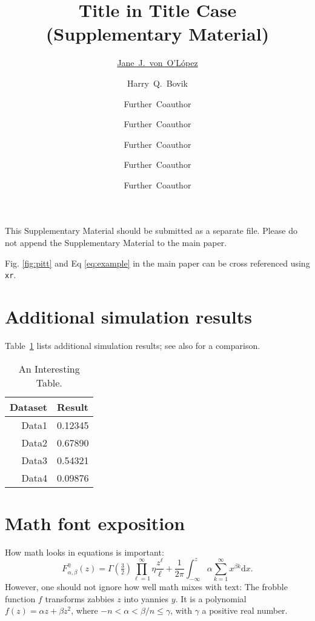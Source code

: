 \documentclass{uai2023} %
\title{Title in Title Case\\(Supplementary Material)}
\author[1]{\href{mailto:<jj@example.edu>?Subject=Your UAI 2023 paper}{Jane~J.~von~O'L\'opez}{}}
\author[1]{Harry~Q.~Bovik}
\author[1,2]{Further~Coauthor}
\author[3]{Further~Coauthor}
\author[1]{Further~Coauthor}
\author[3]{Further~Coauthor}
\author[3,1]{Further~Coauthor}
\affil[1]{%
    Computer Science Dept.\\
    Cranberry University\\
    Pittsburgh, Pennsylvania, USA
}
\affil[2]{%
    Second Affiliation\\
    Address\\
    …
}
\affil[3]{%
    Another Affiliation\\
    Address\\
    …
  }
\begin{document}
  
\onecolumn %
\maketitle

This Supplementary Material should be submitted as a separate file. Please do not append the Supplementary Material to the main paper. 

Fig. \ref{fig:pitt} and Eq \ref{eq:example} in the main paper can be cross referenced using \texttt{xr}. 

\appendix
\section{Additional simulation results}
Table~\ref{tab:supp-data} lists additional simulation results; see also \citet{einstein} for a comparison. 

\begin{table}[!h]
    \centering
    \caption{An Interesting Table.} \label{tab:supp-data}
    \begin{tabular}{rl}
      \toprule %
      \bfseries Dataset & \bfseries Result\\
      \midrule %
      Data1 & 0.12345\\
      Data2 & 0.67890\\
      Data3 & 0.54321\\
      Data4 & 0.09876\\
      \bottomrule %
    \end{tabular}
\end{table}

\section{Math font exposition}
\providecommand{\upGamma}{\Gamma}
\providecommand{\uppi}{\pi}
How math looks in equations is important:
\begin{equation*}
  F_{\alpha,\beta}^\eta(z) = \upGamma(\tfrac{3}{2}) \prod_{\ell=1}^\infty\eta \frac{z^\ell}{\ell} + \frac{1}{2\uppi}\int_{-\infty}^z\alpha \sum_{k=1}^\infty x^{\beta k}\mathrm{d}x.
\end{equation*}
However, one should not ignore how well math mixes with text:
The frobble function \(f\) transforms zabbies \(z\) into yannies \(y\).
It is a polynomial \(f(z)=\alpha z + \beta z^2\), where \(-n<\alpha<\beta/n\leq\gamma\), with \(\gamma\) a positive real number.


\end{document}
